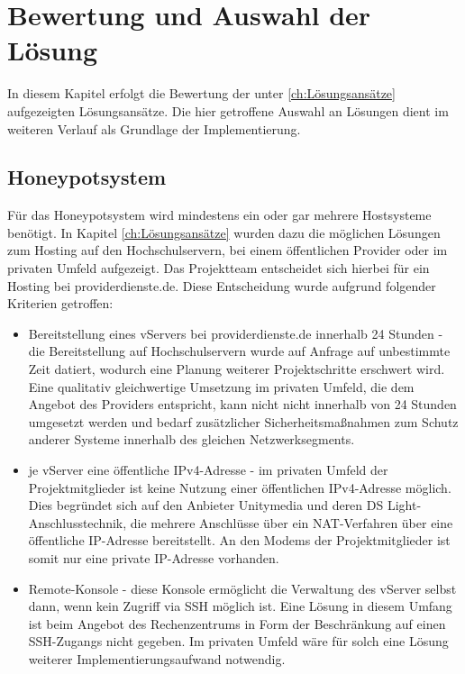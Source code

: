 \chapter{Bewertung und Auswahl der Lösung}
\label{ch:Bewertung und Auswahl der Lösung}

In diesem Kapitel erfolgt die Bewertung der unter \ref{ch:Lösungsansätze} aufgezeigten Lösungsansätze. Die hier getroffene Auswahl an Lösungen dient im weiteren Verlauf als Grundlage der Implementierung.\\

\section{Honeypotsystem}
\label{sec:Honeypotsystem}

Für das Honeypotsystem wird mindestens ein oder gar mehrere Hostsysteme benötigt. In Kapitel \ref{ch:Lösungsansätze} wurden dazu die möglichen Lösungen zum Hosting auf den Hochschulservern, bei einem öffentlichen Provider oder im privaten Umfeld aufgezeigt. Das Projektteam entscheidet sich hierbei für ein Hosting bei providerdienste.de. Diese Entscheidung wurde aufgrund folgender Kriterien getroffen:

\begin{itemize}
\item Bereitstellung eines vServers bei providerdienste.de innerhalb 24 Stunden - die Bereitstellung auf Hochschulservern wurde auf Anfrage auf unbestimmte Zeit datiert, wodurch eine Planung weiterer Projektschritte erschwert wird. Eine qualitativ gleichwertige Umsetzung im privaten Umfeld, die dem Angebot des Providers entspricht, kann nicht nicht innerhalb von 24 Stunden umgesetzt werden und bedarf zusätzlicher Sicherheitsmaßnahmen zum Schutz anderer Systeme innerhalb des gleichen Netzwerksegments.
\item je vServer eine öffentliche IPv4-Adresse - im privaten Umfeld der Projektmitglieder ist keine Nutzung einer öffentlichen IPv4-Adresse möglich. Dies begründet sich auf den Anbieter Unitymedia und deren DS Light-Anschlusstechnik, die mehrere Anschlüsse über ein NAT-Verfahren über eine öffentliche IP-Adresse bereitstellt. An den Modems der Projektmitglieder ist somit nur eine private IP-Adresse vorhanden.
\item Remote-Konsole - diese Konsole ermöglicht die Verwaltung des vServer selbst dann, wenn kein Zugriff via SSH möglich ist. Eine Lösung in diesem Umfang ist beim Angebot des Rechenzentrums in Form der Beschränkung auf einen SSH-Zugangs nicht gegeben. Im privaten Umfeld wäre für solch eine Lösung weiterer Implementierungsaufwand notwendig.
\end{itemize}


